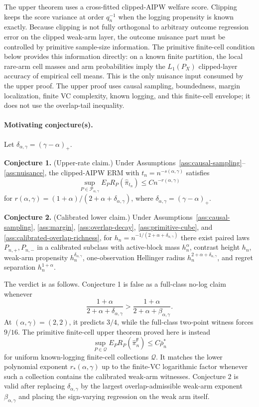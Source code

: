 \documentclass[11pt]{article}
\theoremstyle{definition}
\theoremstyle{plain}
\theoremstyle{remark}
\begin{document}
The upper theorem uses a cross-fitted clipped-AIPW welfare score.  Clipping
keeps the score variance at order \(q_n^{-1}\) when the logging propensity is
known exactly.  Because clipping is not fully orthogonal to arbitrary outcome
regression error on the clipped weak-arm layer, the outcome nuisance part
must be controlled by primitive sample-size information.  The primitive
finite-cell condition below provides this information directly: on a known
finite partition, the local rare-arm cell masses and arm probabilities imply
the \(L_1(P_X)\) clipped-layer accuracy of empirical cell means.  This is the
only nuisance input consumed by the upper proof.  The upper proof uses
causal sampling, boundedness, margin localization, finite VC complexity,
known logging, and this finite-cell envelope; it does not use the overlap-tail
inequality.

\paragraph{Motivating conjecture(s).}
Let \(\delta_{\alpha,\gamma}=(\gamma-\alpha)_+\).

\textbf{Conjecture 1.} (Upper-rate claim.) Under
Assumptions~\ref{ass:causal-sampling}--\ref{ass:nuisance}, the clipped-AIPW
ERM with \(t_n=n^{-s(\alpha,\gamma)}\) satisfies
\[
\sup_{P\in\mathcal{P}_{\alpha,\gamma}}
E_P R_P(\widehat\pi_{t_n})
\le C n^{-r(\alpha,\gamma)}
\]
for \(r(\alpha,\gamma)=(1+\alpha)/(2+\alpha+\delta_{\alpha,\gamma})\), where
\(\delta_{\alpha,\gamma}=(\gamma-\alpha)_+\).

\textbf{Conjecture 2.} (Calibrated lower claim.) Under
Assumptions~\ref{ass:causal-sampling}, \ref{ass:margin},
\ref{ass:overlap-decay}, \ref{ass:primitive-cube}, and
\ref{ass:calibrated-overlap-richness}, for
\(h_n=n^{-1/(2+\alpha+\delta_{\alpha,\gamma})}\) there exist paired laws
\(P_{n,+},P_{n,-}\) in a calibrated subclass with active-block mass
\(h_n^\alpha\), contrast height \(h_n\), weak-arm propensity
\(h_n^{\delta_{\alpha,\gamma}}\), one-observation Hellinger radius
\(h_n^{2+\alpha+\delta_{\alpha,\gamma}}\), and regret separation
\(h_n^{1+\alpha}\).

The verdict is as follows.  Conjecture 1 is false as a full-class no-log
claim whenever
\[
\frac{1+\alpha}{2+\alpha+\delta_{\alpha,\gamma}}
>
\frac{1+\alpha}{2+\alpha+\beta_{\alpha,\gamma}}.
\]
At \((\alpha,\gamma)=(2,2)\), it predicts \(3/4\), while the full-class
two-point witness forces \(9/16\).  The primitive finite-cell upper theorem
proved here is instead
\[
\sup_{P\in\mathcal Q}
E_P R_P(\widehat\pi_n^{\mathsf F})
\le C\bar\rho_n^*
\]
for uniform known-logging finite-cell collections \(\mathcal Q\).  It matches
the lower polynomial exponent \(r_*(\alpha,\gamma)\) up to the finite-VC
logarithmic factor whenever such a collection contains the calibrated
weak-arm witnesses.  Conjecture 2 is valid after replacing
\(\delta_{\alpha,\gamma}\) by the largest overlap-admissible weak-arm exponent
\(\beta_{\alpha,\gamma}\) and placing the sign-varying regression on the weak
arm itself.
\end{document}
